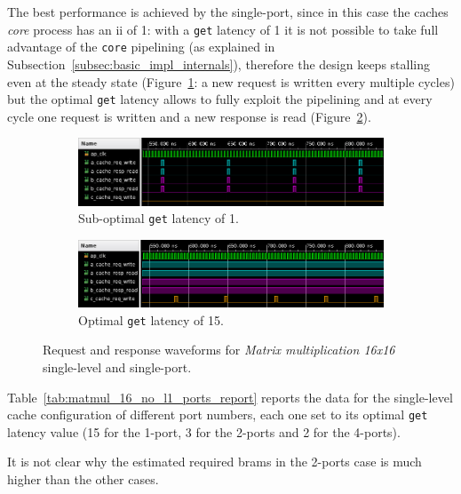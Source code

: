 \documentclass[11pt,a4paper,oneside]{memoir}
\begin{document}
The best performance is achieved by the single-port, since in this case the
caches \emph{core} process has an \ac{ii} of 1: with a \texttt{get} latency of
1 it is not possible to take full advantage of the \texttt{core} pipelining (as
explained in Subsection~\ref{subsec:basic_impl_internals}), therefore the
design keeps stalling even at the steady state
(Figure~\ref{subfig:matmul_wf_latency_1}: a new request is written every
multiple cycles) but the optimal \texttt{get} latency allows to fully exploit
the pipelining and at every cycle one request is written and a new response is
read (Figure~\ref{subfig:matmul_wf_latency_15}). 

\begin{figure}[H]
	\centering
	\begin{subfigure}[b]{.85\textwidth}
		\centering
		\includegraphics[width=\textwidth]{matmul_latency_1}
		\caption{Sub-optimal \texttt{get} latency of 1.}
		\label{subfig:matmul_wf_latency_1}
	\end{subfigure}
	\begin{subfigure}[b]{.85\textwidth}
		\centering
		\includegraphics[width=\textwidth]{matmul_latency_15}
		\caption{Optimal \texttt{get} latency of 15.}
		\label{subfig:matmul_wf_latency_15}
	\end{subfigure}
	\caption{Request and response waveforms for \emph{Matrix multiplication
	16x16} single-level and single-port.}
	\label{fig:matmul_wf}
\end{figure}

Table~\ref{tab:matmul_16_no_l1_ports_report} reports the data for the
single-level cache configuration of different port numbers, each one set to its
optimal \texttt{get} latency value (15 for the 1-port, 3 for the 2-ports and 2
for the 4-ports).

It is not clear why the estimated required \acp{bram} in the 2-ports case is much
higher than the other cases.
\end{document}
